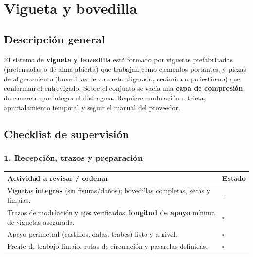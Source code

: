 \documentclass[12pt]{article}
\newcommand{\cbox}{\(\square\)} %
\begin{document}
 
 
 
 
 
 
 
 
 \section{Vigueta y bovedilla}
 
 \subsection*{Descripción general}
 El sistema de \textbf{vigueta y bovedilla} está formado por viguetas prefabricadas (pretensadas o de alma abierta) que trabajan como elementos portantes, y piezas de aligeramiento (bovedillas de concreto aligerado, cerámica o poliestireno) que conforman el entrevigado. Sobre el conjunto se vacía una \textbf{capa de compresión} de concreto que integra el diafragma. Requiere modulación estricta, apuntalamiento temporal y seguir el manual del proveedor.
 

 
 \subsection{Checklist de supervisión}
 
 \subsubsection*{1. Recepción, trazos y preparación}
 \begin{tabularx}{\linewidth}{>{\raggedright\arraybackslash}p{0.93\linewidth} >{\centering\arraybackslash}m{0.07\linewidth}}
 	\toprule
 	\textbf{Actividad a revisar / ordenar} & \textbf{Estado}\\
 	\midrule
 	Viguetas \textbf{íntegras} (sin fisuras/daños); bovedillas completas, secas y limpias. & \cbox \\
 	Trazos de modulación y ejes verificados; \textbf{longitud de apoyo} mínima de viguetas asegurada. & \cbox \\
 	Apoyo perimetral (castillos, dalas, trabes) listo y a nivel. & \cbox \\
 	Frente de trabajo limpio; rutas de circulación y pasarelas definidas. & \cbox \\
 	\bottomrule
 \end{tabularx}
 
\end{document}

